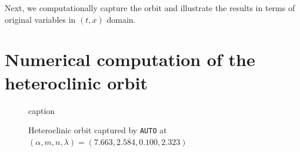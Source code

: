 \documentclass[a4paper,11pt]{article}
\theoremstyle{remark}
\begin{document}
Next, we computationally capture the orbit and illustrate the results in terms of original variables in $(t,x)$ domain.

\section{Numerical computation of the heteroclinic orbit} \label{sec:num_cont}

\begin{figure}[ht]
 \centering
  \quad \quad
  \caption{caption} \label{fig:run12}
\end{figure}

\begin{figure}[ht]
 \centering
  \quad \quad
  \caption{Heteroclinic orbit captured by \texttt{AUTO} at $(\alpha,m,n,\lambda) = (7.663,2.584,0.100,2.323)$} \label{fig:hetero}
\end{figure}
\end{document}
